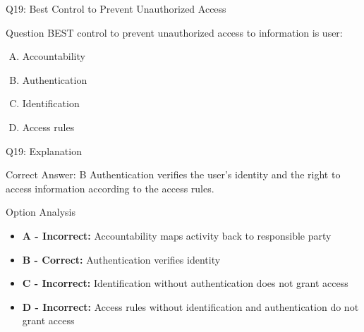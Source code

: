 \documentclass{beamer}
\begin{document}
	\begin{frame}{Q19: Best Control to Prevent Unauthorized Access}
		\begin{block}{Question}
			BEST control to prevent unauthorized access to information is user:
		\end{block}
		\begin{enumerate}[(A)]
			\item Accountability
			\item Authentication
			\item Identification
			\item Access rules
		\end{enumerate}
	\end{frame}
	
	\begin{frame}{Q19: Explanation}
		\begin{block}{Correct Answer: B}
			Authentication verifies the user's identity and the right to access information according to the access rules.
		\end{block}
		\begin{block}{Option Analysis}
			\begin{itemize}
				\item \textbf{A - Incorrect:} Accountability maps activity back to responsible party
				\item \textbf{B - Correct:} Authentication verifies identity
				\item \textbf{C - Incorrect:} Identification without authentication does not grant access
				\item \textbf{D - Incorrect:} Access rules without identification and authentication do not grant access
			\end{itemize}
		\end{block}
	\end{frame}
	
	
	
\end{document}
